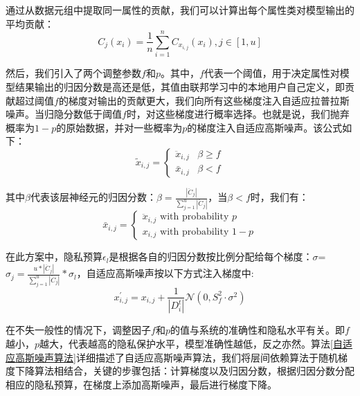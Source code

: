 通过从数据元组中提取同一属性的贡献，我们可以计算出每个属性类对模型输出的平均贡献：
\begin{equation}\label{eq:属性添加自适应扰动}
C_{j}\left(x_{i}\right)=\frac{1}{n} \sum_{i=1}^{n} C_{x_{i, j}}\left(x_{i}\right), j \in[1, u]
\end{equation}

然后，我们引入了两个调整参数$f$和$p$。其中，$f$代表一个阈值，用于决定属性对模型结果输出的归因分数是高还是低，其值由联邦学习中的本地用户自己定义，即贡献超过阈值$f$的梯度对输出的贡献更大，我们向所有这些梯度注入自适应拉普拉斯噪声。当归隐分数低于阈值$f$时，对这些梯度进行概率选择。也就是说，我们抛弃概率为$1-p$的原始数据，并对一些概率为$p$的梯度注入自适应高斯噪声。该公式如下：
\begin{equation}\label{eq:神经网络加噪}
\tilde{x}_{i, j}=\left\{\begin{array}{ll}
\ddot{x}_{i, j} & \beta \geq f \\
\bar{x}_{i, j} & \beta<f
\end{array}\right.
\end{equation}

其中$\beta$代表该层神经元的归因分数：$\beta=\frac{\left|\ddot{C}_{j}\right|}{\sum_{j=1}^{u}\left|\ddot{C}_{j}\right|}$，当$\beta<f$时，我们有：
\begin{equation}\label{eq:神经网络加噪2}
\bar{x}_{i, j}=\left\{\begin{array}{l}
\ddot{x}_{i, j} \text { with probability } p \\
x_{i, j} \text { with probability } 1-p
\end{array}\right.
\end{equation}

在此方案中，隐私预算$\epsilon_{l}$是根据各自的归因分数按比例分配给每个梯度：$\sigma$=$\sigma_{j}=\frac{u *\left|\ddot{C}_{j}\right|}{\sum_{j=1}^{u}\left|\ddot{C}_{j}\right|} * \sigma_{l}$，自适应高斯噪声按以下方式注入梯度中:
\begin{equation}\label{eq:神经网络加噪3}
x_{i, j}^{\prime}=x_{i, j}+\frac{1}{\left|D_{i}^{t}\right|}\mathcal{N}\left(0, S_{f}^{2} \cdot \sigma^{2}\right)
\end{equation}

在不失一般性的情况下，调整因子$f$和$p$的值与系统的准确性和隐私水平有关。即$f$越小，$p$越大，代表越高的隐私保护水平，模型准确性越低，反之亦然。算法\ref{自适应高斯噪声算法}详细描述了自适应高斯噪声算法，我们将层间依赖算法于随机梯度下降算法相结合，关键的步骤包括：计算梯度以及归因分数，根据归因分数分配相应的隐私预算，在梯度上添加高斯噪声，最后进行梯度下降。\\

